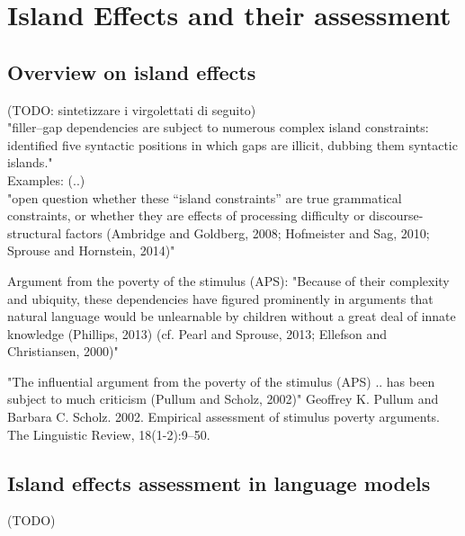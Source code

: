 \section{Island Effects and their assessment}

\subsection{Overview on island effects}

(TODO: sintetizzare i virgolettati di seguito) \\

"filler–gap dependencies are subject to numerous complex island constraints:  \citet{ross1968constraints} identified five syntactic positions in which gaps are illicit, dubbing them syntactic islands." \citep{wilcox2018rnn} \\

Examples: (..) \\

"open question whether these “island constraints” are true grammatical constraints, or whether they are effects of processing difficulty or discourse-structural factors (Ambridge and Goldberg, 2008; Hofmeister and Sag, 2010; Sprouse and Hornstein, 2014)" \citep{wilcox2018rnn} 

Argument from the poverty of the stimulus (APS):
"Because of their complexity and ubiquity, these dependencies have figured prominently in arguments that natural language would be unlearnable by children without a great deal of innate knowledge (Phillips, 2013) (cf. Pearl and Sprouse, 2013; Ellefson and Christiansen, 2000)" \citep{wilcox2018rnn} 

"The influential argument from the poverty of the stimulus (APS) ..  has been subject to much criticism (Pullum and Scholz, 2002)"  Geoffrey K. Pullum and Barbara C. Scholz. 2002. Empirical assessment of stimulus poverty arguments. The Linguistic Review, 18(1-2):9–50.



\subsection{Island effects assessment in language models}

(TODO)


